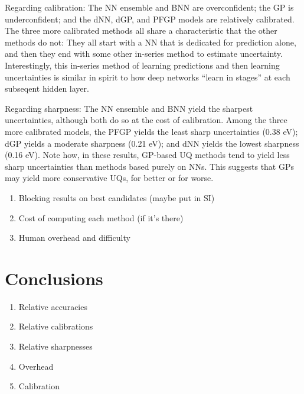 \documentclass[]{achemso}
\begin{document}
Regarding calibration:  The \gls{NN} ensemble and \gls{BNN} are overconfident; the \gls{GP} is underconfident; and the \gls{dNN}, \gls{dGP}, and \gls{PFGP} models are relatively calibrated.
The three more calibrated methods all share a characteristic that the other methods do not:  They all start with a \gls{NN} that is dedicated for prediction alone, and then they end with some other in-series method to estimate uncertainty.
Interestingly, this in-series method of learning predictions and then learning uncertainties is similar in spirit to how deep networks ``learn in stages'' at each subseqent hidden layer.

Regarding sharpness:  The \gls{NN} ensemble and \gls{BNN} yield the sharpest uncertainties, although both do so at the cost of calibration.
Among the three more calibrated models, the \gls{PFGP} yields the least sharp uncertainties (0.38 eV); \gls{dGP} yields a moderate sharpness (0.21 eV); and \gls{dNN} yields the lowest sharpness (0.16 eV).
Note how, in these results, \gls{GP}-based \gls{UQ} methods tend to yield less sharp uncertainties than methods based purely on \gls{NN}s.
This suggests that \gls{GP}s may yield more conservative \gls{UQ}s, for better or for worse.

\begin{enumerate}
    \item{Blocking results on best candidates (maybe put in SI)}
    \item{Cost of computing each method (if it’s there)}
    \item{Human overhead and difficulty}
\end{enumerate}



\section{Conclusions}

\begin{enumerate}
    \item{Relative accuracies}
    \item{Relative calibrations}
    \item{Relative sharpnesses}
    \item{Overhead}
    \item{Calibration}
\end{enumerate}


\end{document}
